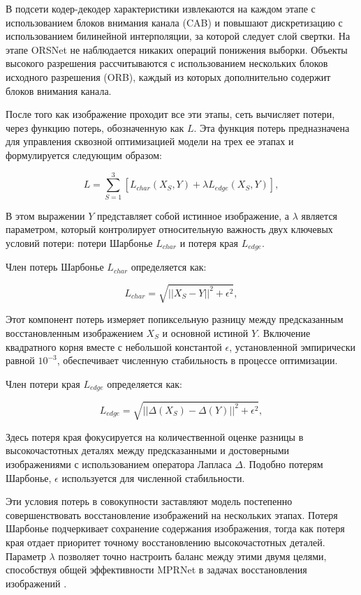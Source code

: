 В подсети кодер-декодер характеристики извлекаются на каждом этапе с использованием блоков внимания канала (CAB) и повышают дискретизацию с использованием билинейной интерполяции, за которой следует слой свертки. На этапе ORSNet не наблюдается никаких операций понижения выборки. Объекты высокого разрешения рассчитываются с использованием нескольких блоков исходного разрешения (ORB), каждый из которых дополнительно содержит блоков внимания канала.

После того как изображение проходит все эти этапы, сеть вычисляет потери, через функцию потерь, обозначенную как \(L\). Эта функция потерь предназначена для управления сквозной оптимизацией модели на трех ее этапах и формулируется следующим образом:

\begin{equation}
	L = \sum_{S=1}^{3} [L_{char}(X_S, Y) + \lambda L_{edge}(X_S, Y)],
\end{equation}

В этом выражении \( Y \) представляет собой истинное изображение, а \( \lambda \) является параметром, который контролирует относительную важность двух ключевых условий потери: потери Шарбонье \( L_{char} \) и потеря края \( L_{edge} \).

Член потерь Шарбонье \( L_{char} \) определяется как:

\begin{equation}
	L_{char} = \sqrt{\vert\vert X_S - Y \vert\vert^2 + \epsilon^2},
\end{equation}

Этот компонент потерь измеряет попиксельную разницу между предсказанным восстановленным изображением \( X_S \) и основной истиной \( Y \). Включение квадратного корня вместе с небольшой константой \( \epsilon \), установленной эмпирически равной \( 10^{-3} \), обеспечивает численную стабильность в процессе оптимизации.

Член потери края \( L_{edge} \) определяется как:

\begin{equation}
	L_{edge} = \sqrt{\vert\vert\Delta(X_S) - \Delta(Y)\vert\vert^2 + \epsilon^2},
\end{equation}

Здесь потеря края фокусируется на количественной оценке разницы в высокочастотных деталях между предсказанными и достоверными изображениями с использованием оператора Лапласа \(\Delta\). Подобно потерям Шарбонье, \( \epsilon \) используется для численной стабильности.

Эти условия потерь в совокупности заставляют модель постепенно совершенствовать восстановление изображений на нескольких этапах. Потеря Шарбонье подчеркивает сохранение содержания изображения, тогда как потеря края отдает приоритет точному восстановлению высокочастотных деталей. Параметр \( \lambda \) позволяет точно настроить баланс между этими двумя целями, способствуя общей эффективности MPRNet в задачах восстановления изображений \cite{zamir2021multi}.

